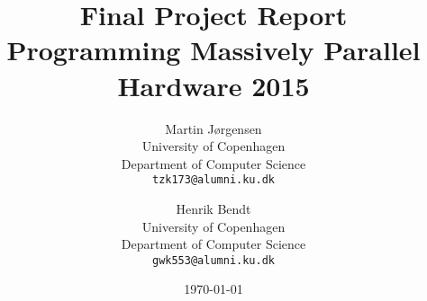 \documentclass[a4paper,11pt]{article}
\title{\textbf{Final Project Report\\ Programming Massively Parallel Hardware 2015}}
\author
{
    Martin Jørgensen \\
    University of Copenhagen \\
    Department of Computer Science \\
    {\tt tzk173@alumni.ku.dk}
    \and
    Henrik Bendt \\
    University of Copenhagen \\
    Department of Computer Science \\
    {\tt gwk553@alumni.ku.dk}
}
\date{\today}
\begin{document}
\maketitle

\tableofcontents
\pagebreak










\appendix


\end{document}

